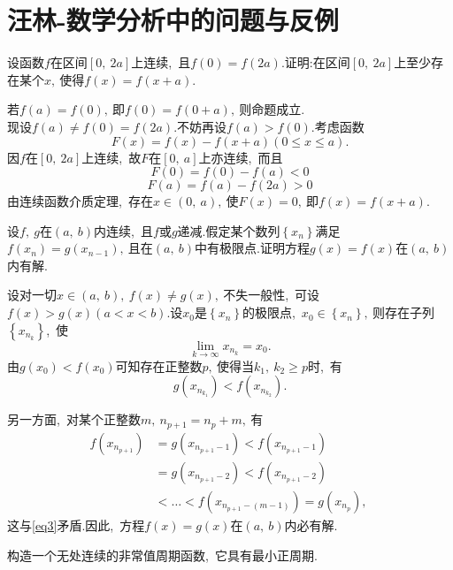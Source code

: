 	\section{汪林-数学分析中的问题与反例}
	\begin{problem}
		设函数$f$在区间$\left[0,\ 2a\right]$上连续,\ 且$f(0)=f(2a).$证明:在区间$\left[0,\ 2a\right]$上至少存在某个$x,\ $使得$f(x)=f(x + a).$
	\end{problem}
	\begin{solution}
		若$f(a) = f(0),\ $即$f(0) = f(0+a),\ $则命题成立.\\
		现设$f(a)\neq f(0) = f(2a).$不妨再设$f(a) > f(0).$考虑函数
		$$F(x)=f(x)-f(x+a) (0\le x \le a).$$
		因$f$在$\left[0,\ 2a\right]$上连续,\ 故$F$在$\left[0,\ a\right]$上亦连续,\ 而且
		$$F(0)=f(0)-f(a)<0$$
		$$F(a)=f(a)-f(2a)>0$$
		由连续函数介质定理,\ 存在$x\in (0,\ a),\ $使$F(x)=0,\ $即$f(x)=f(x + a).$ 
	\end{solution}
	\newpage
	\begin{problem}
		设$f,\ g$在$\left(a,\ b\right)$内连续,\ 且$f$或$g$递减.假定某个数列$\left\{x_n\right\}$满足$f(x_n) = g(x_{n-1}),\ $且在$\left(a,\ b\right)$中有极限点.证明方程$g(x) = f(x)$在$\left(a,\ b\right)$内有解.
	\end{problem}
	
	\begin{solution}
		设对一切$x\in\left(a,\ b\right),\ f(x)\neq g(x),\ $不失一般性,\ 可设$f(x)>g(x)(a<x<b).$设$x_0$是$\left\{x_n\right\}$的极限点,\ $x_0\in \left\{x_n\right\},\ $则存在子列$\left\{x_{n_k}\right\}$,\ 使
		$$\lim\limits_{k\rightarrow \infty}x_{n_k}=x_0.$$
		由$g(x_0)<f(x_0)$可知存在正整数$p,\ $使得当$k_1,\ k_2\ge p$时,\ 有
		\begin{equation}
			g(x_{n_{k_1}})<f(x_{n_{k_2}}).\label{eq3}
		\end{equation}
		
		另一方面,\ 对某个正整数$m,\ n_{p+1}=n_p+m,\ $有
		$$\begin{aligned}
			f(x_{n_{p+1}})&=g(x_{n_{p+1}-1})<f(x_{n_{p+1}-1})\\
			&=g(x_{n_{p+1}-2})<f(x_{n_{p+1}-2})\\ 
			&<\dots<f(x_{n_{p+1}-(m-1)})=g(x_{n_p}),\ 
		\end{aligned}$$
		这与\eqref{eq3}矛盾.因此,\ 方程$f(x)=g(x)$在$\left(a,\ b\right)$内必有解. 
	\end{solution}
	\newpage
	
	\begin{problem}
		构造一个无处连续的非常值周期函数,\ 它具有最小正周期.
	\end{problem}
	

